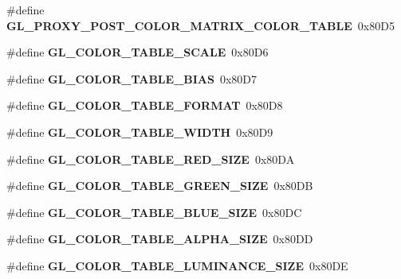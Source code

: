 \begin{DoxyCompactItemize}
\item 
\#define {\bfseries G\+L\+\_\+\+P\+R\+O\+X\+Y\+\_\+\+P\+O\+S\+T\+\_\+\+C\+O\+L\+O\+R\+\_\+\+M\+A\+T\+R\+I\+X\+\_\+\+C\+O\+L\+O\+R\+\_\+\+T\+A\+B\+L\+E}~0x80\+D5\label{_s_d_l__opengl_8h_a1fd5301bba01002fbdc77099780c6e56}

\item 
\#define {\bfseries G\+L\+\_\+\+C\+O\+L\+O\+R\+\_\+\+T\+A\+B\+L\+E\+\_\+\+S\+C\+A\+L\+E}~0x80\+D6\label{_s_d_l__opengl_8h_aec92579e9017715501644fa75665b1b2}

\item 
\#define {\bfseries G\+L\+\_\+\+C\+O\+L\+O\+R\+\_\+\+T\+A\+B\+L\+E\+\_\+\+B\+I\+A\+S}~0x80\+D7\label{_s_d_l__opengl_8h_a32cd65a4ace7f64260fbec54c818d3db}

\item 
\#define {\bfseries G\+L\+\_\+\+C\+O\+L\+O\+R\+\_\+\+T\+A\+B\+L\+E\+\_\+\+F\+O\+R\+M\+A\+T}~0x80\+D8\label{_s_d_l__opengl_8h_a9e3a3ded630592037491f0c62fd8a381}

\item 
\#define {\bfseries G\+L\+\_\+\+C\+O\+L\+O\+R\+\_\+\+T\+A\+B\+L\+E\+\_\+\+W\+I\+D\+T\+H}~0x80\+D9\label{_s_d_l__opengl_8h_a55444a6503044558791cb85d4e9b100c}

\item 
\#define {\bfseries G\+L\+\_\+\+C\+O\+L\+O\+R\+\_\+\+T\+A\+B\+L\+E\+\_\+\+R\+E\+D\+\_\+\+S\+I\+Z\+E}~0x80\+D\+A\label{_s_d_l__opengl_8h_a8afb15e935de90877c7e3eefdd28c133}

\item 
\#define {\bfseries G\+L\+\_\+\+C\+O\+L\+O\+R\+\_\+\+T\+A\+B\+L\+E\+\_\+\+G\+R\+E\+E\+N\+\_\+\+S\+I\+Z\+E}~0x80\+D\+B\label{_s_d_l__opengl_8h_a5a9954d296cfbdee62b745eda2bca3b0}

\item 
\#define {\bfseries G\+L\+\_\+\+C\+O\+L\+O\+R\+\_\+\+T\+A\+B\+L\+E\+\_\+\+B\+L\+U\+E\+\_\+\+S\+I\+Z\+E}~0x80\+D\+C\label{_s_d_l__opengl_8h_ae8e8734ba40b80cfe017c1a961093a3f}

\item 
\#define {\bfseries G\+L\+\_\+\+C\+O\+L\+O\+R\+\_\+\+T\+A\+B\+L\+E\+\_\+\+A\+L\+P\+H\+A\+\_\+\+S\+I\+Z\+E}~0x80\+D\+D\label{_s_d_l__opengl_8h_a1471c5feb1934db1bf576fc60c6e97e7}

\item 
\#define {\bfseries G\+L\+\_\+\+C\+O\+L\+O\+R\+\_\+\+T\+A\+B\+L\+E\+\_\+\+L\+U\+M\+I\+N\+A\+N\+C\+E\+\_\+\+S\+I\+Z\+E}~0x80\+D\+E\label{_s_d_l__opengl_8h_a7bb97bb6797e2ce543d0314bcc6f7530}


\end{DoxyCompactItemize}
